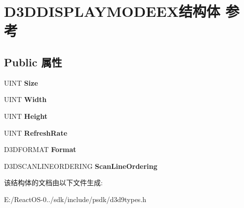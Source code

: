 \hypertarget{struct_d3_d_d_i_s_p_l_a_y_m_o_d_e_e_x}{}\section{D3\+D\+D\+I\+S\+P\+L\+A\+Y\+M\+O\+D\+E\+E\+X结构体 参考}
\label{struct_d3_d_d_i_s_p_l_a_y_m_o_d_e_e_x}
\subsection*{Public 属性}
\begin{DoxyCompactItemize}
\item 
\mbox{\label{struct_d3_d_d_i_s_p_l_a_y_m_o_d_e_e_x_a39e08350a43319fb6321a1c9e353ad5f}} 
U\+I\+NT {\bfseries Size}
\item 
\mbox{\label{struct_d3_d_d_i_s_p_l_a_y_m_o_d_e_e_x_a398cd9b94fd7b7b2ad7c56c5b7c4241b}} 
U\+I\+NT {\bfseries Width}
\item 
\mbox{\label{struct_d3_d_d_i_s_p_l_a_y_m_o_d_e_e_x_a234495c16edfc29eb458360c3e20dbde}} 
U\+I\+NT {\bfseries Height}
\item 
\mbox{\label{struct_d3_d_d_i_s_p_l_a_y_m_o_d_e_e_x_a931007756bfe0e311f7309b7c02468e8}} 
U\+I\+NT {\bfseries Refresh\+Rate}
\item 
\mbox{\label{struct_d3_d_d_i_s_p_l_a_y_m_o_d_e_e_x_a592cc0578b125503c6aaf860dc48d5c8}} 
D3\+D\+F\+O\+R\+M\+AT {\bfseries Format}
\item 
\mbox{\label{struct_d3_d_d_i_s_p_l_a_y_m_o_d_e_e_x_adb1c70153be1fb3ccc77bb4c31f5e026}} 
D3\+D\+S\+C\+A\+N\+L\+I\+N\+E\+O\+R\+D\+E\+R\+I\+NG {\bfseries Scan\+Line\+Ordering}
\end{DoxyCompactItemize}


该结构体的文档由以下文件生成\+:\begin{DoxyCompactItemize}
\item 
E\+:/\+React\+O\+S-\/0../sdk/include/psdk/d3d9types.\+h\end{DoxyCompactItemize}
